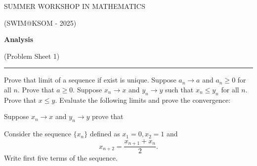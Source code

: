 \documentclass[fleqn]{exam}
\begin{document}
\begin{center}
	{\huge SUMMER WORKSHOP IN MATHEMATICS}
	
	\bigskip
	
	{\large (SWIM@KSOM - 2025)}
	
	\bigskip


	\textbf{\Large Analysis}
	
	\medskip

	{\large (Problem Sheet 1)}

	\medskip
	
	\hrule
\end{center}


\begin{questions}
	\question Prove that limit of a sequence if exist is unique.
	\question Suppose $a_n\to a$ and $a_n\geq 0$ for all $n$. Prove that $a\geq 0$.
	\question Suppose $x_n\to x$ and $y_n\to y$ such that $x_n\leq y_n$ for all $n$. Prove that $x\leq y$. 
	\question Evaluate the following limits and prove the convergence:
	\question Suppose $x_n\to x$ and $y_n\to y$ prove that 
	\question Consider the sequence $\{x_n\}$ defined as $x_1=0,x_2=1$ and 
	\[x_{n+2}=\frac{x_{n+1}+x_{n}}{2}.\]
	Write first five terms of the sequence.
\end{questions}
\end{document}
